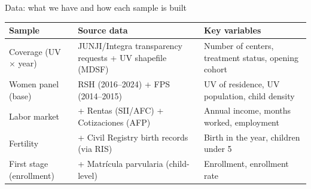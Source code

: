 \documentclass[aspectratio=169,10pt]{beamer}
\newcommand{\takeaway}[1]{\par\vspace{6pt}{\small\textcolor{steel}{$\Rightarrow$}\ \textbf{\textcolor{navy}{#1}}}}
\begin{document}
\begin{frame}{Data: what we have and how each sample is built}
\small
\begin{center}
\renewcommand{\arraystretch}{1.35}
\begin{tabular}{@{}>{\raggedright\arraybackslash}p{2.8cm}>{\raggedright\arraybackslash}p{5.0cm}>{\raggedright\arraybackslash}p{4.6cm}@{}}
\toprule
\textbf{Sample} & \textbf{Source data} & \textbf{Key variables} \\
\midrule
Coverage (UV $\times$ year) & JUNJI/Integra transparency requests + UV shapefile (MDSF) & Number of centers, treatment status, opening cohort \\
Women panel (base) & RSH (2016--2024) + FPS (2014--2015) & UV of residence, UV population, child density \\
Labor market & + Rentas (SII/AFC) + Cotizaciones (AFP) & Annual income, months worked, employment \\
Fertility & + Civil Registry birth records (via RIS) & Birth in the year, children under 5 \\
First stage (enrollment) & + Matr\'icula parvularia (child-level) & Enrollment, enrollment rate \\
\bottomrule
\end{tabular}
\end{center}
\takeaway{All administrative registries, linked at the individual level --- no survey self-reports.}
\end{frame}
\end{document}
